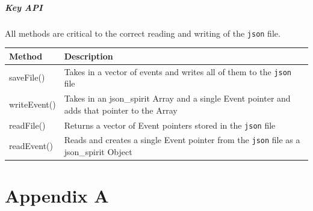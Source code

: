 \documentclass[12pt]{extarticle}
\begin{document}
\subparagraph{Key API}All methods are critical to the correct reading and writing of the \texttt{json} file.\\
\begin{tabular}{p{6cm} p{12cm}}
Method & Description\\
\hline
saveFile() & Takes in a vector of events and writes all of them to the \texttt{json} file\\
writeEvent() & Takes in an json\_spirit Array and a single Event pointer and adds that pointer to the Array\\
readFile() & Returns a vector of Event pointers stored in the \texttt{json} file\\
readEvent() & Reads and creates a single Event pointer from the \texttt{json} file as a json\_spirit Object\\
\end{tabular}

\newpage

\section{Appendix A}
\end{document}
